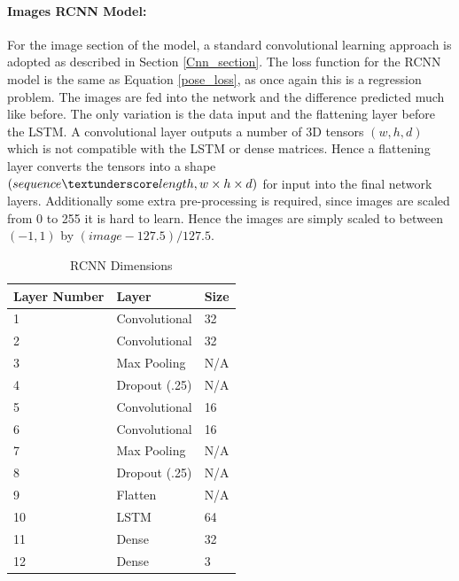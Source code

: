 \documentclass[11pt,twoside]{report}
\begin{document}
\paragraph{Images RCNN Model:} \label{images_rcnn}
For the image section of the model, a standard convolutional learning approach is adopted as described in Section \ref{Cnn_section}. The loss function for the RCNN model is the same as Equation \ref{pose_loss}, as once again this is a regression problem. The images are fed into the network and the difference predicted much like before. The only variation is the data input and the flattening layer before the LSTM. A convolutional layer outputs a number of 3D tensors $(w,h,d)$ which is not compatible with the LSTM or dense matrices. Hence a flattening layer converts the tensors into a shape $(sequence \textunderscore length, w \times h \times d)$ for input into the final network layers. Additionally some extra pre-processing is required, since images are scaled from 0 to 255 it is hard to learn. Hence the images are simply scaled to between $(-1,1)$ by $(image-127.5)/127.5$.

\noindent \begin{table}[h!]
	\centering
	\begin{tabular}{|p{3.5cm}|p{3.5cm}|p{3.5cm}|}
		\hline
		\textbf{Layer Number}&\textbf{Layer} & \textbf{Size}                                  \\ \hline
		1  & Convolutional   &   32     \\ \hline
		2  & Convolutional   &   32     \\ \hline
		3  & Max Pooling     &   N/A    \\ \hline
		4  & Dropout (.25)   &   N/A    \\ \hline
		5  & Convolutional   &   16     \\ \hline
		6  & Convolutional   &   16     \\ \hline
		7  & Max Pooling     &   N/A    \\ \hline  
		8  & Dropout (.25)   &   N/A    \\ \hline
		9  & Flatten         &   N/A    \\ \hline
		10 & LSTM            &   64     \\ \hline   
		11 & Dense           &   32     \\ \hline 
		12 & Dense           &   3      \\ \hline 
		                                                                           
	\end{tabular}
\caption{RCNN Dimensions}
\end{table}
\end{document}
